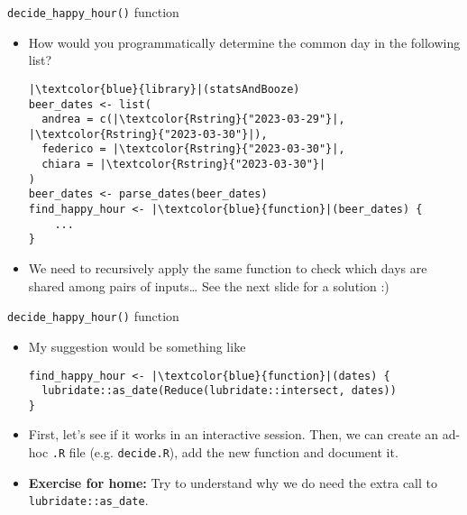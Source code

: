 \documentclass[
hyperref={bookmarks=false},
xcolor={dvipsnames,svgnames*,x11names*}, 
12pt
]{beamer}
\begin{document}
\begin{frame}[fragile]{\texttt{decide\_happy\_hour()} function}
\vspace{-0.5cm}
\begin{itemize}
\item How would you programmatically determine the common day in the following list?
\begin{lstlisting}
|\textcolor{blue}{library}|(statsAndBooze)
beer_dates <- list(
  andrea = c(|\textcolor{Rstring}{"2023-03-29"}|, |\textcolor{Rstring}{"2023-03-30"}|), 
  federico = |\textcolor{Rstring}{"2023-03-30"}|,
  chiara = |\textcolor{Rstring}{"2023-03-30"}|
)
beer_dates <- parse_dates(beer_dates)
find_happy_hour <- |\textcolor{blue}{function}|(beer_dates) {
	... 
}
\end{lstlisting}
\item We need to recursively apply the same function to check which days are shared among pairs of inputs\dots\; See the next slide for a solution :)
\end{itemize}
\end{frame}

\begin{frame}[fragile]{\texttt{decide\_happy\_hour()} function}
\vspace{-0.5cm}
\begin{itemize}
\itemsep 2ex
\item My suggestion would be something like
\begin{lstlisting}
find_happy_hour <- |\textcolor{blue}{function}|(dates) {
  lubridate::as_date(Reduce(lubridate::intersect, dates))
}
\end{lstlisting}
\item First, let's see if it works in an interactive session. Then, we can create an ad-hoc \texttt{.R} file (e.g. \texttt{decide.R}), add the new function and document it. 
\item \textbf{Exercise for home:} Try to understand why we do need the extra call to \texttt{lubridate::as\_date}.
\end{itemize}
\end{frame}
\end{document}
